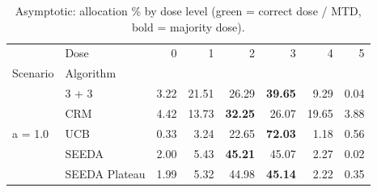 \begin{table}[H]
\centering
\caption{Asymptotic: allocation \% by dose level (green = correct dose / MTD, bold = majority dose).}
\label{tab:asym_alloc_by_dose}
\begin{tabular}{llrrrrrr}
\toprule
 & Dose & 0 & 1 & 2 & 3 & 4 & 5 \\
Scenario & Algorithm &  &  &  &  &  &  \\
\midrule
\multirow[c]{5}{*}{a = 1.0} & 3 + 3 & 3.22 & 21.51 & {\cellcolor[HTML]{C8E6C9}} 26.29 & \bfseries 39.65 & 9.29 & 0.04 \\
 & CRM & 4.42 & 13.73 & {\cellcolor[HTML]{C8E6C9}} \bfseries 32.25 & 26.07 & 19.65 & 3.88 \\
 & UCB & 0.33 & 3.24 & {\cellcolor[HTML]{C8E6C9}} 22.65 & \bfseries 72.03 & 1.18 & 0.56 \\
 & SEEDA & 2.00 & 5.43 & {\cellcolor[HTML]{C8E6C9}} \bfseries 45.21 & 45.07 & 2.27 & 0.02 \\
 & SEEDA Plateau & 1.99 & 5.32 & {\cellcolor[HTML]{C8E6C9}} 44.98 & \bfseries 45.14 & 2.22 & 0.35 \\
\bottomrule
\end{tabular}
\end{table}
